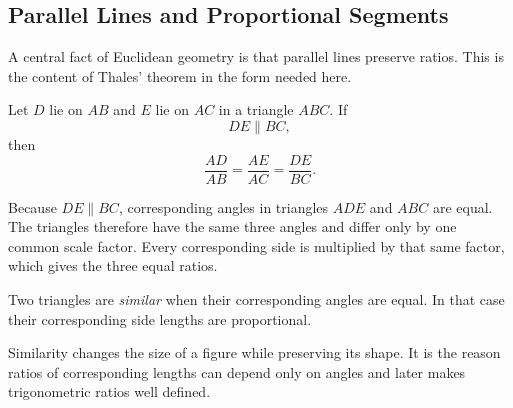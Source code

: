 \subsection{Parallel Lines and Proportional Segments}

A central fact of Euclidean geometry is that parallel lines preserve ratios.
This is the content of Thales' theorem in the form needed here.

\begin{theorembox}
Let $D$ lie on $AB$ and $E$ lie on $AC$ in a triangle $ABC$. If
\[
DE\parallel BC,
\]
then
\[
\boxed{
\frac{AD}{AB}
=
\frac{AE}{AC}
=
\frac{DE}{BC}
}.
\]
\end{theorembox}

\begin{center}
\end{center}

\begin{proofbox}
Because $DE\parallel BC$, corresponding angles in triangles $ADE$ and $ABC$
are equal. The triangles therefore have the same three angles and differ only by
one common scale factor. Every corresponding side is multiplied by that same
factor, which gives the three equal ratios.
\end{proofbox}

\begin{definitionbox}
Two triangles are \emph{similar} when their corresponding angles are equal. In
that case their corresponding side lengths are proportional.
\end{definitionbox}

\begin{interpretationbox}
Similarity changes the size of a figure while preserving its shape. It is the
reason ratios of corresponding lengths can depend only on angles and later makes
trigonometric ratios well defined.
\end{interpretationbox}
